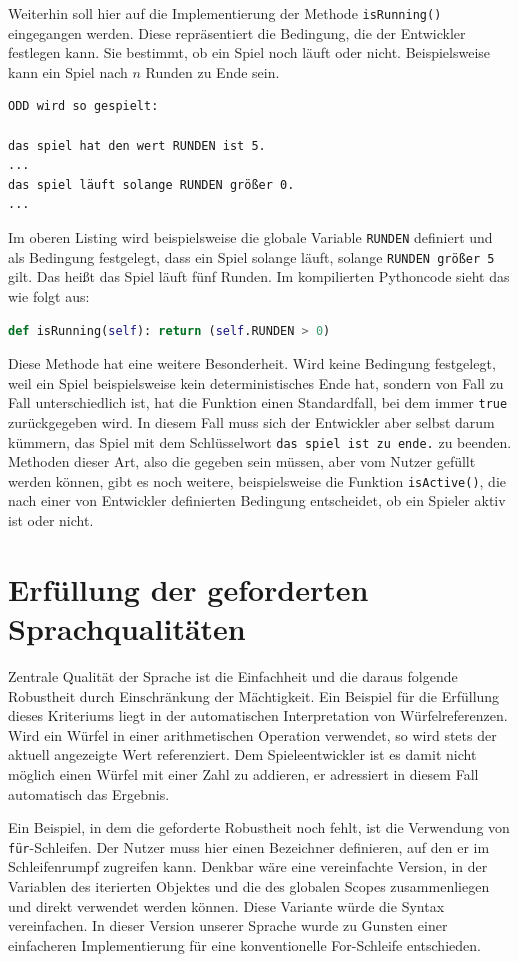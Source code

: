 	Weiterhin soll hier auf die Implementierung der Methode \texttt{isRunning()} eingegangen werden. Diese repräsentiert die Bedingung, die der Entwickler festlegen kann. Sie bestimmt, ob ein Spiel noch läuft oder nicht. Beispielsweise kann ein Spiel nach $n$ Runden zu Ende sein.
\begin{lstlisting}[label={lst:ODD}]
ODD wird so gespielt:

das spiel hat den wert RUNDEN ist 5.
...
das spiel läuft solange RUNDEN größer 0.
...
\end{lstlisting}
	Im oberen Listing wird beispielsweise die globale Variable \texttt{RUNDEN} definiert und als Bedingung festgelegt, dass ein Spiel solange läuft, solange \texttt{RUNDEN größer 5} gilt. Das heißt das Spiel läuft fünf Runden. Im kompilierten Pythoncode sieht das wie folgt aus:
\begin{lstlisting}[language=Python]
def isRunning(self): return (self.RUNDEN > 0)
\end{lstlisting}
	Diese Methode hat eine weitere Besonderheit. Wird keine Bedingung festgelegt, weil ein Spiel beispielsweise kein deterministisches Ende hat, sondern von Fall zu Fall unterschiedlich ist, hat die Funktion einen Standardfall, bei dem immer \texttt{true} zurückgegeben wird. In diesem Fall muss sich der Entwickler aber selbst darum kümmern, das Spiel mit dem Schlüsselwort \texttt{das spiel ist zu ende.} zu beenden. Methoden dieser Art, also die gegeben sein müssen, aber vom Nutzer gefüllt werden können, gibt es noch weitere, beispielsweise die Funktion \texttt{isActive()}, die nach einer von Entwickler definierten Bedingung entscheidet, ob ein Spieler aktiv ist oder nicht.

\section{Erfüllung der geforderten Sprachqualitäten}
\label{sec:erfullung_der_geforderten_sprachqualitaten}
	Zentrale Qualität der Sprache ist die Einfachheit und die daraus folgende Robustheit durch Einschränkung der Mächtigkeit. Ein Beispiel für die Erfüllung dieses Kriteriums liegt in der automatischen Interpretation von Würfelreferenzen. Wird ein Würfel in einer arithmetischen Operation verwendet, so wird stets der aktuell angezeigte Wert referenziert. Dem Spieleentwickler ist es damit nicht möglich einen Würfel mit einer Zahl zu addieren, er adressiert in diesem Fall automatisch das Ergebnis.

	Ein Beispiel, in dem die geforderte Robustheit noch fehlt, ist die Verwendung von \texttt{für}-Schleifen. Der Nutzer muss hier einen Bezeichner definieren, auf den er im Schleifenrumpf zugreifen kann. Denkbar wäre eine vereinfachte Version, in der Variablen des iterierten Objektes und die des globalen Scopes zusammenliegen und direkt verwendet werden können. Diese Variante würde die Syntax vereinfachen. In dieser Version unserer Sprache wurde zu Gunsten einer einfacheren Implementierung für eine konventionelle For-Schleife entschieden.

